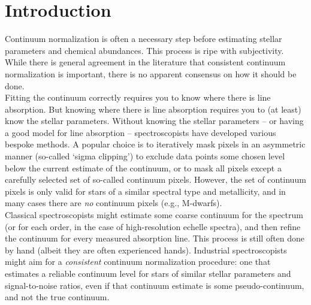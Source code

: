 \documentclass[modern]{aastex631}
\begin{document}

\section*{}\clearpage
\section{Introduction}\label{sec:intro}

Continuum normalization is often a necessary step before estimating stellar parameters and chemical abundances.
This process is ripe with subjectivity.
While there is general agreement in the literature that consistent continuum normalization is important, there is no apparent consensus on how it should be done.\\

Fitting the continuum correctly requires you to know where there is line absorption. But knowing where there is line absorption requires you to (at least) know the stellar parameters. Without knowing the stellar parameters -- or having a good model for line absorption -- spectroscopists have developed various bespoke methods. A popular choice is to iteratively mask pixels in an asymmetric manner (so-called `sigma clipping') to exclude data points some chosen level below the current estimate of the continuum, or to mask all pixels except a carefully selected set of so-called continuum pixels. However, the set of continuum pixels is only valid for stars of a similar spectral type and metallicity, and in many cases there are \emph{no} continuum pixels (e.g., M-dwarfs).\\

Classical spectroscopists might estimate some coarse continuum for the spectrum (or for each order, in the case of high-resolution echelle spectra), and then refine the continuum for every measured absorption line. This process is still often done by hand (albeit they are often experienced hands). Industrial spectroscopists might aim for a \emph{consistent} continuum normalization procedure: one that estimates a reliable continuum level for stars of similar stellar parameters and signal-to-noise ratios, even if that continuum estimate is some pseudo-continuum, and not the true continuum.\\
\end{document}
